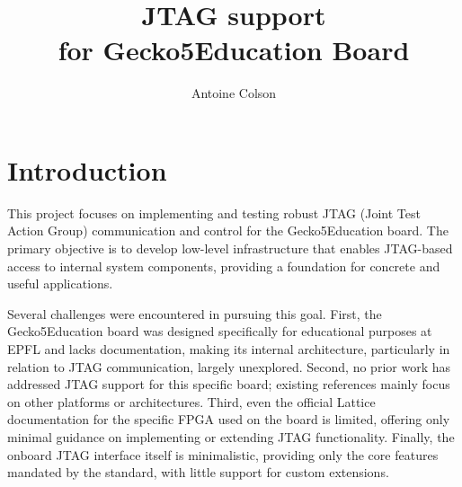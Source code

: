 \documentclass[a4paper,11pt,oneside]{report}
\title{JTAG support \\for Gecko5Education Board}
\author{Antoine Colson}
\newcommand{\boardName}{Gecko5Education \xspace}
\begin{document}
\maketitle




\maketoc

\chapter{Introduction}

This project focuses on implementing and testing robust JTAG (Joint Test Action Group) communication and control for the \boardName board.
The primary objective is to develop low-level infrastructure that enables JTAG-based access to internal system components, providing a foundation for concrete and useful applications.

Several challenges were encountered in pursuing this goal.
First, the \boardName board was designed specifically for educational purposes at EPFL and lacks documentation, 
making its internal architecture, particularly in relation to JTAG communication, largely unexplored.
Second, no prior work has addressed JTAG support for this specific board; existing references mainly focus on other platforms or architectures.
Third, even the official Lattice documentation \cite{lattice_semiconductor_fpga_2020} for the specific FPGA used on the board is limited, 
offering only minimal guidance on implementing or extending JTAG functionality.
Finally, the onboard JTAG interface itself is minimalistic, 
providing only the core features mandated by the standard, with little support for custom extensions.
\end{document}
